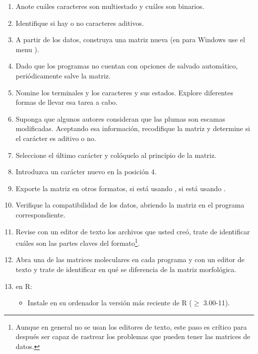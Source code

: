 \begin{enumerate}
	\item Anote cu\'ales caracteres son multiestado y cu\'ales son binarios.

	\item Identifique si hay o no caracteres aditivos.

	\item A partir de los datos, construya una matriz nueva (en  para Windows use el menu ). 

	\item Dado que los programas no cuentan con opciones de salvado autom\'atico, peri\'odicamente salve la matriz.

	\item Nomine los terminales y los caracteres y sus estados. Explore diferentes formas de llevar esa tarea a cabo. 

	\item Suponga que algunos autores consideran que las plumas son escamas modificadas. Aceptando esa informaci\'on, recodifique la matriz y determine si el car\'acter es aditivo o no.

	\item Seleccione el \'ultimo car\'acter y col\'oquelo al principio de la matriz. 

	\item Introduzca un car\'acter nuevo en la posici\'on 4.

	\item Exporte la matriz en otros formatos,  si est\'a usando ,  si est\'a usando .

	\item Verifique la compatibilidad de los datos, abriendo la matriz en el programa correspondiente.

	\item Revise con un editor de texto los archivos que usted cre\'o, trate de identificar cu\'ales son las partes claves del formato\footnote{Aunque en general no se usan los editores de texto, este paso es cr\'itico para despu\'es ser capaz de rastrear los problemas que pueden tener las matrices de datos.}.

	\item Abra una de las matrices moleculares en cada programa y con un editor de texto y trate de identificar en qu\'e se diferencia de la matriz morfol\'ogica.

	\item en R:
	\begin{itemize}
		\item Instale en su ordenador la versi\'on m\'as reciente de R ($\ge$ 3.00-11). 


\end{itemize}
\end{enumerate}
